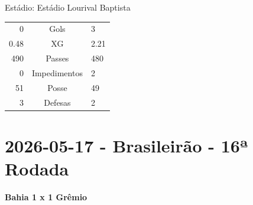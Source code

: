 \documentclass[11pt]{article}
\newcommand{\teamjersey}{}
\begin{document}
\begin{minipage}{0.3\textwidth}
Estádio: Estádio Lourival Baptista\\
\begin{tabular}{rcl}
0 & Gols & 3 \\
0.48 & XG & 2.21 \\
490 & Passes & 480 \\
0 & Impedimentos & 2 \\
51 & Posse & 49 \\
3 & Defesas & 2 \\
\end{tabular}
\end{minipage}
\newpage
\section*{2026-05-17 - Brasileirão - 16ª Rodada}
\textbf{Bahia 1 x 1 Grêmio}\\
\vspace{0.5cm}
\renewcommand{\teamjersey}{../assets/camisa/costas1.png}
\end{document}
